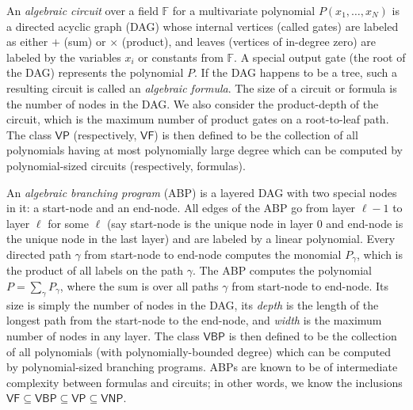 \documentclass[10pt,a4paper]{article}
\theoremstyle{definition}%
\theoremstyle{plain}
\newcommand{\VP}{\mathsf{VP}}
\newcommand{\VBP}{\mathsf{VBP}}
\newcommand{\VNP}{\mathsf{VNP}}
\newcommand{\VF}{\mathsf{VF}}
\newcommand{\F}{\mathbb F}
\newcommand{\sse}{\subseteq}
\begin{document}
An \emph{algebraic circuit} over a field $\F$ for a multivariate polynomial $P(x_1,\ldots,x_N)$ is a directed acyclic graph (DAG)
whose internal vertices (called gates) are labeled as either $+$ (sum) or $\times$ (product), and leaves
(vertices of in-degree zero) are labeled by the variables $x_i$ or constants from $\F$. 
A special output gate (the root of the DAG) represents the polynomial
$P$. 
If the DAG happens to be a tree, such a resulting circuit is called an \emph{algebraic formula}. 
The size of a circuit or formula is the number of nodes in the DAG. We also consider the product-depth of the circuit, which is the maximum number of product gates on a root-to-leaf path. 
The class $\VP$ (respectively, $\VF$) is then defined to be the collection of all polynomials having at most polynomially large degree which can be computed by polynomial-sized circuits (respectively, formulas).

An \emph{algebraic branching program} (ABP) is a layered DAG with two special nodes in
it: a start-node and an end-node. All edges of the ABP go from layer $\ell -1$ to layer $\ell$ for some $\ell$ (say start-node is the unique node in layer $0$ and end-node is the unique node in the last layer) and are labeled by a linear polynomial. Every directed path $\gamma$ from start-node to end-node computes the monomial $P_\gamma$,
which is the product of all labels on the path $\gamma$. The ABP computes the polynomial $P = \sum_{\gamma} P_\gamma$,
where the sum is over all paths $\gamma$ from start-node to end-node. Its size is simply the number of nodes in the DAG, its \emph{depth} is the length of the longest path from the start-node to the end-node, and \emph{width} is the maximum number of nodes in any layer. The class $\VBP$ is then defined to be the collection of all polynomials (with polynomially-bounded degree) which can be computed by polynomial-sized branching programs. ABPs are known to be of intermediate complexity between formulas and circuits; in other words, we know the inclusions $\VF\subseteq\VBP \subseteq \VP\sse \VNP$.
\end{document}
